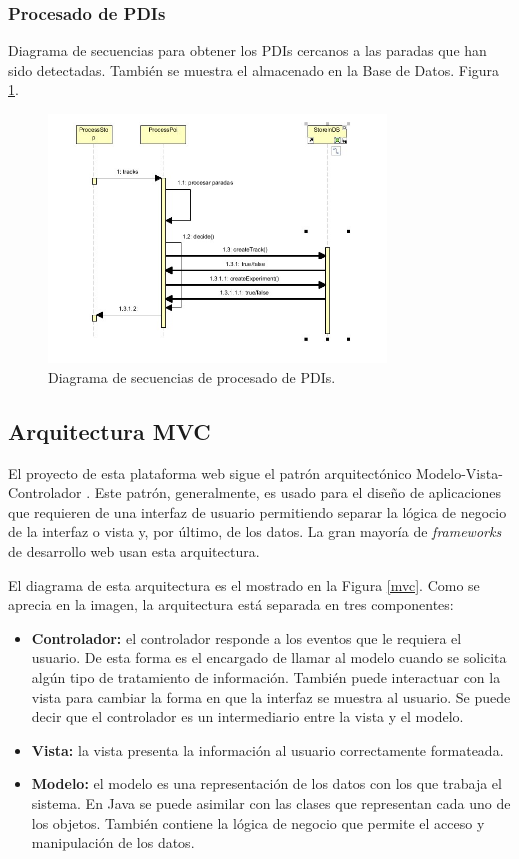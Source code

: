 \subsubsection{Procesado de PDIs}
Diagrama de secuencias para obtener los PDIs cercanos a las paradas que han sido detectadas. También se muestra el almacenado en la Base de Datos. Figura \ref{pdis}.
\begin{figure}[!htbp]
  \centering
    \includegraphics[width=0.8\textwidth]{../img/diagramas/secuencias/10.jpg}
  \caption{Diagrama de secuencias de procesado de PDIs.}
  \label{pdis}
\end{figure}


\subsection{Arquitectura MVC}

El proyecto de esta plataforma web sigue el patrón arquitectónico Modelo-Vista-Controlador \cite{mvc:wiki}. Este patrón, generalmente, es usado para el diseño de aplicaciones que requieren de una interfaz de usuario permitiendo separar la lógica de negocio de la interfaz o vista y, por último, de los datos. La gran mayoría de \textit{frameworks} de desarrollo web usan esta arquitectura.

El diagrama de esta arquitectura es el mostrado en la Figura \ref{mvc}. Como se aprecia en la imagen, la arquitectura está separada en tres componentes:

\begin{itemize}
	\item \textbf{Controlador:} el controlador responde a los eventos que le requiera el usuario. De esta forma es el encargado de llamar al modelo cuando se solicita algún tipo de tratamiento de información. También puede interactuar con la vista para cambiar la forma en que la interfaz se muestra al usuario. Se puede decir que el controlador es un intermediario entre la vista y el modelo.
	\item \textbf{Vista:} la vista presenta la información al usuario correctamente formateada.
	\item \textbf{Modelo:} el modelo es una representación de los datos con los que trabaja el sistema. En Java se puede asimilar con las clases que representan cada uno de los objetos. También contiene la lógica de negocio que permite el acceso y manipulación de los datos.
\end{itemize}

